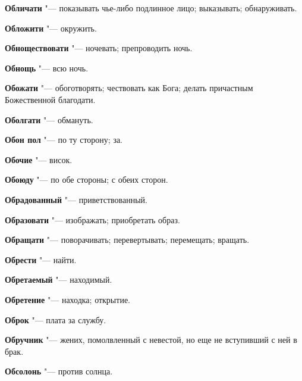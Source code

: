 \begin{mymulticols}{2}
\noindent\textbf{Обличати} "--- показывать чье-либо подлинное лицо; выказывать; обнаруживать. 




\noindent\textbf{Обложити} "--- окружить. 




\noindent\textbf{Обноществовати} "--- ночевать; препроводить ночь. 




\noindent\textbf{Обнощь} "--- всю ночь. 




\noindent\textbf{Обожати} "--- обоготворять; чествовать как Бога; делать причастным Божественной благодати. 




\noindent\textbf{Оболгати} "--- обмануть. 




\noindent\textbf{Обон пол} "--- по ту сторону; за. 




\noindent\textbf{Обочие} "--- висок. 




\noindent\textbf{Обоюду} "--- по обе стороны; с обеих сторон. 




\noindent\textbf{Обрадованный} "--- приветствованный. 




\noindent\textbf{Образовати} "--- изображать; приобретать образ. 




\noindent\textbf{Обращати} "--- поворачивать; перевертывать; перемещать; вращать. 




\noindent\textbf{Обрести} "--- найти. 




\noindent\textbf{Обретаемый} "--- находимый. 




\noindent\textbf{Обретение} "--- находка; открытие. 




\noindent\textbf{Оброк} "--- плата за службу. 




\noindent\textbf{Обручник} "--- жених, помолвленный с невестой, но еще не вступивший с ней в брак. 




\noindent\textbf{Обсолонь} "--- против солнца. 





\end{mymulticols}
